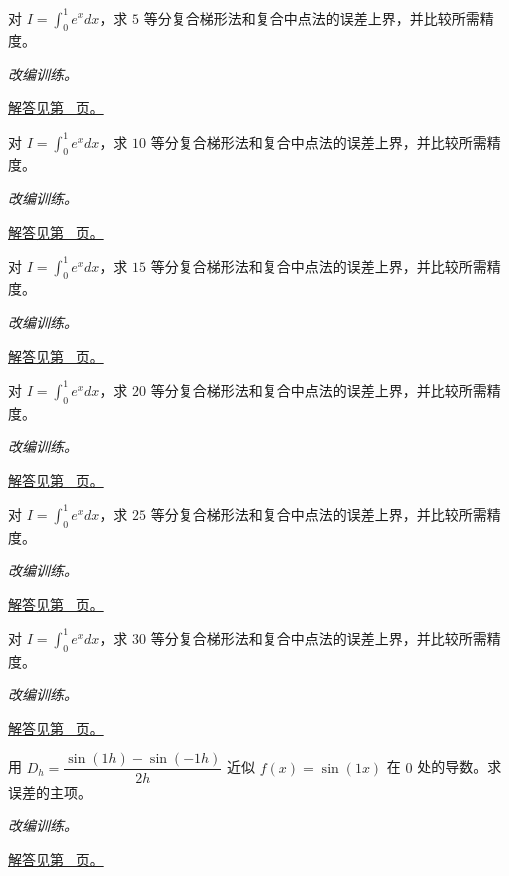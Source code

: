 \documentclass[12pt,fontset=fandol]{ctexart}
\begin{document}
\begin{example}[用导数界选择网格]\label{ex:c18q13}
对 $I=\int_0^1e^x dx$，求 $5$ 等分复合梯形法和复合中点法的误差上界，并比较所需精度。
\par\textit{改编训练。}\par\hyperref[ans:c18q13]{解答见第~\pageref{ans:c18q13} 页。}
\end{example}
\begin{example}[用导数界选择网格]\label{ex:c18q14}
对 $I=\int_0^1e^x dx$，求 $10$ 等分复合梯形法和复合中点法的误差上界，并比较所需精度。
\par\textit{改编训练。}\par\hyperref[ans:c18q14]{解答见第~\pageref{ans:c18q14} 页。}
\end{example}
\begin{example}[用导数界选择网格]\label{ex:c18q15}
对 $I=\int_0^1e^x dx$，求 $15$ 等分复合梯形法和复合中点法的误差上界，并比较所需精度。
\par\textit{改编训练。}\par\hyperref[ans:c18q15]{解答见第~\pageref{ans:c18q15} 页。}
\end{example}
\begin{example}[用导数界选择网格]\label{ex:c18q16}
对 $I=\int_0^1e^x dx$，求 $20$ 等分复合梯形法和复合中点法的误差上界，并比较所需精度。
\par\textit{改编训练。}\par\hyperref[ans:c18q16]{解答见第~\pageref{ans:c18q16} 页。}
\end{example}
\begin{example}[用导数界选择网格]\label{ex:c18q17}
对 $I=\int_0^1e^x dx$，求 $25$ 等分复合梯形法和复合中点法的误差上界，并比较所需精度。
\par\textit{改编训练。}\par\hyperref[ans:c18q17]{解答见第~\pageref{ans:c18q17} 页。}
\end{example}
\begin{example}[用导数界选择网格]\label{ex:c18q18}
对 $I=\int_0^1e^x dx$，求 $30$ 等分复合梯形法和复合中点法的误差上界，并比较所需精度。
\par\textit{改编训练。}\par\hyperref[ans:c18q18]{解答见第~\pageref{ans:c18q18} 页。}
\end{example}
\begin{example}[中心差分的截断误差]\label{ex:c18q19}
用 $D_h=\dfrac{\sin(1h)-\sin(-1h)}{2h}$ 近似 $f(x)=\sin(1x)$ 在 $0$ 处的导数。求误差的主项。
\par\textit{改编训练。}\par\hyperref[ans:c18q19]{解答见第~\pageref{ans:c18q19} 页。}
\end{example}
\end{document}
